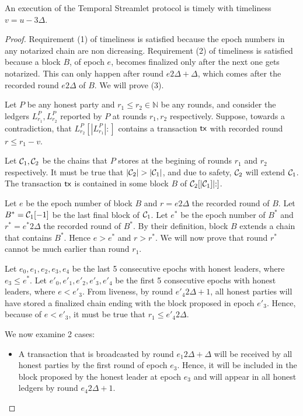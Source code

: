 \begin{theorem}
  An execution of the Temporal Streamlet protocol is timely
  with timeliness $v = u - 3 \Delta$.
\end{theorem}
\begin{proof}
  Requirement (1) of timeliness is satisfied because the epoch numbers in any notarized chain
  are non dicreasing.
  Requirement (2) of timeliness is satisfied because a block $B$, of epoch $e$, becomes finalized
  only after the next one gets notarized. This can only happen after round $e 2 \Delta + \Delta$,
  which comes after the recorded round $e 2 \Delta$ of $B$.
  We will prove (3).

  Let $P$ be any honest party and $r_1 \leq r_2 \in \mathbb{N}$ be any rounds, and consider
  the ledgers $L^P_{r_1}, L^P_{r_2}$ reported by $P$ at rounds $r_1, r_2$ respectively.
  Suppose, towards a contradiction, that $L^P_{r_2}[|L^P_{r_1}|{:}]$ contains a transaction
  $\textsf{tx}$ with recorded round $r \leq r_1 - v$.

  Let $\mathcal{C}_1, \mathcal{C}_2$ be the chains that $P$ stores at the begining of rounds $r_1$
  and $r_2$ respectively.
  It must be true that $|\mathcal{C}_2| > |\mathcal{C}_1|$, and due to safety, $\mathcal{C}_2$ will extend $\mathcal{C}_1$.
  The transaction $\textsf{tx}$ is contained in some block $B$ of $\mathcal{C}_2[|\mathcal{C}_1]|{:}]$.

  Let $e$ be the epoch number of block $B$ and $r = e 2 \Delta$ the recorded round of $B$.
  Let $B^* = \mathcal{C}_1[-1]$ be the last final block of $\mathcal{C}_1$. Let $e^*$ be the epoch
  number of $B^*$ and $r^* = e^* 2 \Delta$ the recorded round of $B^*$.
  By their definition, block $B$ extends a chain that contains $B^*$. Hence
  $e > e^*$ and $r > r^*$.
  We will now prove that round $r^*$ cannot be much earlier than round $r_1$.


  Let $e_0,e_1,e_2,e_3,e_4$ be the last 5 consecutive epochs with honest leaders,
  where $e_3 \leq e^*$. Let $e'_0,e'_1,e'_2,e'_3,e'_4$ be the first 5 consecutive epochs
  with honest leaders, where $e < e'_3$.
  From liveness, by round $e'_4 2 \Delta + 1$, all honest parties will have stored
  a finalized chain ending with the block proposed in epoch $e'_3$. Hence, because
  of $e < e'_3$, it must be true that $r_1 \leq e'_4 2 \Delta$.

  We now examine 2 cases:
  \begin{itemize}
    \item A transaction that is broadcasted by round $e_1 2 \Delta + \Delta$
      will be received by all honest parties by the first round of epoch $e_3$.
      Hence, it will be included in the block proposed by the honest leader at
      epoch $e_3$ and will appear in all honest ledgers by round $e_4 2 \Delta + 1$.


\end{itemize}
\end{proof}
